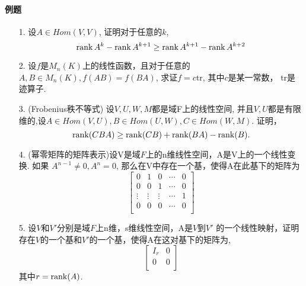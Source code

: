 \paragraph{例题}
\begin{itemize}
	\item [1.] 设$A \in Hom(V,V)$, 证明对于任意的$k$, 
	$$\rank{A^k} - \rank{A^{k+1}} \ge \rank{A^{k+1}} - \rank{A^{k+2}}$$
	\vspace{3cm}

	\item [2.] 设$f$是$M_n(K)$上的线性函数，且对于任意的$A,B \in M_n(K),
	f(AB)=f(BA)$, 求证$f=c \mathrm{tr}$, 其中$c$是某一常数，
	$\mathrm{tr}$是迹算子.
	\vspace{2cm}

	\item [3.] (Frobenius秩不等式) 设$V,U,W,M$都是域F上的线性空间,
    并且$V,U$都是有限维的,设$A \in Hom(V,U), B \in Hom(U,W), C \in Hom(W,M)$.
    证明，$$\rank(CBA) \ge \rank(CB) + \rank(BA) - \rank(B).$$
    \vspace{2cm}

    \item [4.] (幂零矩阵的矩阵表示)设V是域$F$上的n维线性空间，A是V上的一个线性变换. 如果
    $A^{n-1} \ne 0, A^n = 0$, 那么在V中存在一个基，使得A在此基下的矩阵为
    \begin{equation}
    \nonumber
    \begin{bmatrix}
        0& 1& 0& \cdots &0\\
        0& 0& 1& \cdots &0\\
        \vdots& \vdots& \vdots& \cdots & 1\\
        0& 0& 0& \cdots &0\\
    \end{bmatrix}
    \end{equation}
    \vspace{3cm}

    \item [5.] 设$V$和$V'$分别是域$F$上n维，s维线性空间，A是$V$到$V'$
    的一个线性映射，证明存在$V$的一个基和$V'$的一个基，使得A在这对基下的矩阵为,
    \begin{equation}
    \nonumber
    \begin{bmatrix}
        I_r& 0\\
        0&   0\\
    \end{bmatrix}
    \end{equation}
    其中$r = \rank(A)$.
    \vspace{3cm}


\end{itemize}
